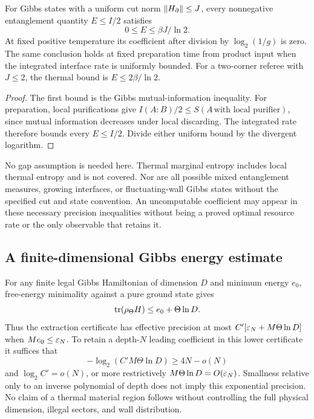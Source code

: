 \begin{corollary}\label{cor:fixedresources}
For Gibbs states with a uniform cut norm $\lVert H_\partial\rVert\leq J$,
every nonnegative entanglement quantity $E\leq I/2$ satisfies
\[
 0\leq E\leq\beta J/\ln2.
\]
At fixed positive temperature its coefficient after division by
$\log_2(1/g)$ is zero. The same conclusion holds at fixed preparation
time from product input when the integrated interface rate is uniformly
bounded. For a two-corner referee with $J\leq2$, the thermal bound is
$E\leq2\beta/\ln2$.
\end{corollary}
\begin{proof}
The first bound is the Gibbs mutual-information inequality. For
preparation, local purifications give
$I(A:B)/2\leq S(A\,\text{with local purifier})$, since mutual
information decreases under local discarding. The integrated rate
therefore bounds every $E\leq I/2$. Divide either uniform bound by
the divergent logarithm.
\end{proof}
No gap assumption is needed here. Thermal marginal entropy includes
local thermal entropy and is not covered. Nor are all possible mixed
entanglement measures, growing interfaces, or fluctuating-wall Gibbs
states without the specified cut and state convention. An uncomputable
coefficient may appear in these necessary precision inequalities
without being a proved optimal resource rate or the only observable
that retains it.

\subsection{A finite-dimensional Gibbs energy estimate}
For any finite legal Gibbs Hamiltonian of dimension $D$ and minimum
energy $e_0$, free-energy minimality against a pure ground state gives
\begin{equation}\label{eq:gibbsenergy}
 \operatorname{tr}(\rho_\Theta H)\leq e_0+\Theta\ln D.
\end{equation}
Thus the extraction certificate has effective precision at most
$C'[\varepsilon_N+M\Theta\ln D]$ when $Me_0\leq\varepsilon_N$.
To retain a depth-$N$ leading coefficient in this lower certificate it
suffices that
\[
 -\log_2(C'M\Theta\ln D)\geq4N-o(N)
\]
and $\log_2C'=o(N)$, or more restrictively
$M\Theta\ln D=O(\varepsilon_N)$. Smallness relative only to an inverse
polynomial of depth does not imply this exponential precision. No
claim of a thermal material region follows without controlling the
full physical dimension, illegal sectors, and wall distribution.

